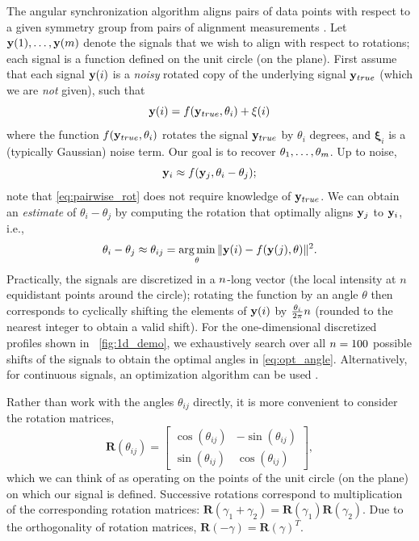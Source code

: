 The angular synchronization algorithm aligns pairs of data points with respect to a given symmetry group from pairs of alignment measurements \citep{singer2011angular}. 
%
Let $ \mathbf{y}(1), \dots, \mathbf{y}(m)$ denote the signals that we wish to align with respect to rotations;
each signal is a function defined on the unit circle (on the plane).
%
First assume that each signal $\mathbf{y}(i)$ is a {\it noisy} rotated copy of the underlying signal $\mathbf{y}_{true}$
(which we are {\it not} given), such that
\begin{equation}
\mathbf{y}(i) = f(\mathbf{y}_{true}, \theta_i) + \mathbf{\xi}(i)
\end{equation}
where the function $f(\mathbf{y}_{true}, \theta_i)$ rotates the signal $\mathbf{y}_{true}$ by $\theta_i$ degrees, and $\mathbf{\xi}_i$ is a (typically Gaussian) noise term.
%
Our goal is to recover $\theta_1, \dots, \theta_m$.
%
Up to noise,
\begin{equation} \label{eq:pairwise_rot}
\mathbf{y}_i \approx f(\mathbf{y}_j, \theta_i - \theta_j) ;
\end{equation}
note that \eqref{eq:pairwise_rot} does not require knowledge of $\mathbf{y}_{true}$.
%
We can obtain an {\it estimate} of $\theta_i - \theta_j$ by computing the rotation that optimally aligns $\mathbf{y}_j$ to $\mathbf{y}_i$,
i.e., %
%
\begin{equation} \label{eq:opt_angle}
\theta_i - \theta_j \approx \theta_{ij} = \operatorname*{arg\,min}_{\theta} \|\mathbf{y}(i) - f(\mathbf{y}(j), \theta)\|^2.
\end{equation}
%
Practically, the signals are discretized in a $n$-long vector (the local intensity at $n$ equidistant points around the circle);
rotating the function by an angle $\theta$ then corresponds to cyclically shifting the elements of $\mathbf{y}(i)$
by $\frac{\theta_i}{2 \pi} n$ (rounded to the nearest integer to obtain a valid shift).
%
For the one-dimensional discretized profiles shown in \fig~\ref{fig:1d_demo}, we exhaustively search over all $n=100$ possible shifts of the signals to obtain the optimal angles in \eqref{eq:opt_angle}.
%
Alternatively, for continuous signals, an optimization algorithm
can be used \citep{ahuja2007template}.

Rather than work with the angles $\theta_{ij}$ directly, it is more convenient to consider the rotation matrices,
\begin{equation} \label{eq:R_theta}
\mathbf{R}(\theta_{ij}) = \begin{bmatrix}
\cos(\theta_{ij}) & -\sin(\theta_{ij}) \\
\sin(\theta_{ij}) & \cos(\theta_{ij})
\end{bmatrix},
\end{equation}
which we can think of as operating on the points of the unit circle (on the plane) on which our signal is defined.
%
Successive rotations correspond to multiplication of the corresponding rotation matrices: $\mathbf{R}(\gamma_1 + \gamma_2) = \mathbf{R}(\gamma_1) \mathbf{R}(\gamma_2)$.
%
Due to the orthogonality of rotation matrices, $\mathbf{R}(-\gamma) = \mathbf{R}(\gamma)^T$.

